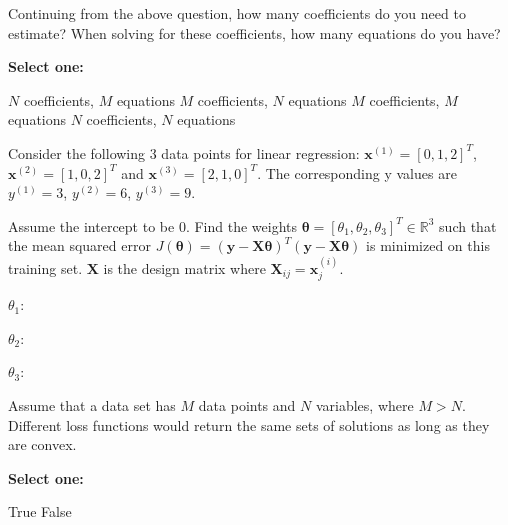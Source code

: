 \documentclass[11pt,addpoints,answers]{exam}
\numberwithin{equation}{section} %
\numberwithin{figure}{section} %
\numberwithin{table}{section} %
\newcommand{\xv}{\mathbf{x}}
\newcommand{\yv}{\mathbf{y}}
\newcommand{\Xv}{\mathbf{X}}
\newcommand{\thetav     }{\boldsymbol \theta     }
\begin{document}
\begin{questions}
    
    
    \clearpage
    
    \question[3] Continuing from the above question, how many coefficients do you need to estimate? When solving for these coefficients, how many equations do you have?
    
    \textbf{Select one:}
    \begin{checkboxes}
        \choice $N$ coefficients, $M$ equations
        \choice $M$ coefficients, $N$ equations
        \choice $M$ coefficients, $M$ equations
        \choice $N$ coefficients, $N$ equations
    \end{checkboxes}
    
    
    \question[3] Consider the following 3 data points for linear regression: $\xv^{(1)} = [0, 1, 2]^T$, $\xv^{(2)} = [1, 0, 2]^T$ and $\xv^{(3)} = [2, 1, 0]^T$. The corresponding y values are $y^{(1)}=3$, $y^{(2)}=6$, $y^{(3)}=9$.
    
    Assume the intercept to be 0. Find the weights $\thetav = [\theta_1,  \theta_2,  \theta_3]^T \in \mathbb{R}^3$ such that the mean squared error $J(\thetav) = (\mathbf{\yv} - \Xv \thetav)^T(\mathbf{\yv} - \Xv \thetav)$ is minimized on this training set. $\Xv$ is the design matrix where $\Xv_{ij} = \xv_j^{(i)}$. 
    
    $\theta_1$: \quad
    \begin{tcolorbox}[fit,height=1cm, width=4cm, blank, borderline={1pt}{-2pt},nobeforeafter, top=2pt, left=2pt, right=2pt, bottom=2pt]
    \end{tcolorbox}
    
    
    $\theta_2$: \quad
    \begin{tcolorbox}[fit,height=1cm, width=4cm, blank, borderline={1pt}{-2pt},nobeforeafter, top=2pt, left=2pt, right=2pt, bottom=2pt]
    \end{tcolorbox}
    
    
    $\theta_3$: \quad
    \begin{tcolorbox}[fit,height=1cm, width=4cm, blank, borderline={1pt}{-2pt},nobeforeafter, top=2pt, left=2pt, right=2pt, bottom=2pt]
    \end{tcolorbox}
    
    

    \question[2] Assume that a data set has $M$ data points and $N$ variables, where $M>N$. Different loss functions would return the same sets of solutions as long as they are convex.
    
    \textbf{Select one:}
    \begin{checkboxes}
        \choice True
        \choice False
    \end{checkboxes}
    

\end{questions}
\end{document}
